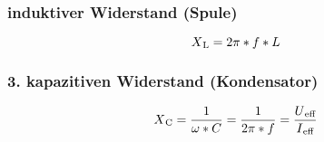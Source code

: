 \documentclass{scrartcl}
\begin{document}
                \subsubsection{induktiver Widerstand (Spule)}
                \begin{equation}
                    X\textsubscript{L}=2\pi*f*L
                \end{equation}
                \subsubsection*{3. kapazitiven Widerstand (Kondensator)}
                \begin{equation}
                    X\textsubscript{C}= \frac{1}{\omega*C}=\frac{1}{2\pi*f}=\frac{U\textsubscript{eff}}{I\textsubscript{eff}}
                \end{equation}
\end{document}
